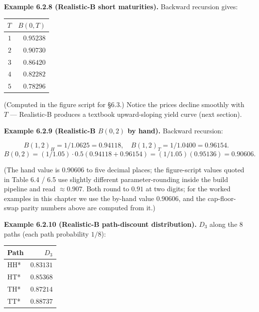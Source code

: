 \documentclass[
  10pt,
  twoside]{book}
\newcounter{none} %
\begin{document}
\textbf{Example 6.2.8 (Realistic-B short maturities).} Backward
recursion gives:

{\def\LTcaptype{none} %
\begin{table}[H]
\centering
\begin{tabular}{|r|r|}
\toprule
\(T\) & \(B(0, T)\) \\
\midrule



\(1\) & \(0.95238\) \\
\(2\) & \(0.90730\) \\
\(3\) & \(0.86420\) \\
\(4\) & \(0.82282\) \\
\(5\) & \(0.78296\) \\
\bottomrule
\end{tabular}
\end{table}
}

(Computed in the figure script for §6.3.) Notice the prices decline
smoothly with \(T\) --- Realistic-B produces a textbook upward-sloping
yield curve (next section).

\textbf{Example 6.2.9 (Realistic-B \(B(0, 2)\) by hand).} Backward
recursion:

\[B(1, 2)_H = 1/1.0625 = 0.94118, \quad B(1, 2)_T = 1/1.0400 = 0.96154.\]
\[B(0, 2) = (1/1.05) \cdot 0.5(0.94118 + 0.96154) = (1/1.05)(0.95136) = 0.90606.\]

(The hand value is \(0.90606\) to five decimal places; the figure-script
values quoted in Table 6.4 / 6.5 use slightly different
parameter-rounding inside the build pipeline and read \(\approx 0.907\).
Both round to \(0.91\) at two digits; for the worked examples in this
chapter we use the by-hand value \(0.90606\), and the cap-floor-swap
parity numbers above are computed from it.)

\textbf{Example 6.2.10 (Realistic-B path-discount distribution).}
\(D_3\) along the 8 paths (each path probability \(1/8\)):

{\def\LTcaptype{none} %
\begin{table}[H]
\centering
\begin{tabular}{|l|r|}
\toprule
Path & \(D_3\) \\
\midrule



HH* & \(0.83131\) \\
HT* & \(0.85368\) \\
TH* & \(0.87214\) \\
TT* & \(0.88737\) \\
\bottomrule
\end{tabular}
\end{table}
}
\end{document}
